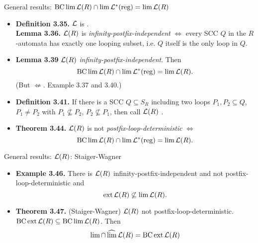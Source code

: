 \documentclass[
	handout,
	notheorems,noamsthm]{beamer}
\begin{document}
\begin{frame}[<+->]{General results: $\operatorname{BC} \lim \mathcal{L}(R) \cap \lim \mathcal{L}^*(\textup{\textrm{reg}}) = \lim \mathcal{L}(R)$}
\begin{itemize}
\item
\textbf{Definition 3.35.} $\mathcal{L}$ is . \\
\textbf{Lemma 3.36.} $\mathcal{L}(R)$ is \emph{infinity-postfix-independent} $\Leftrightarrow$ every SCC $Q$ in the $R$-automata has exactly one looping subset, i.e. $Q$ itself is the only loop in $Q$.
\item \textbf{Lemma 3.39} $\mathcal{L}(R)$ \emph{infinity-postfix-independent}. Then
\[ \operatorname{BC} \lim \mathcal{L}(R) \cap \lim \mathcal{L}^*(\textup{\textrm{reg}}) = \lim \mathcal{L}(R) . \]
(But $\not\Leftarrow$. Example 3.37 and 3.40.)
\item \textbf{Definition 3.41.} If there is a SCC $Q \subseteq S_R$ including two loops $P_1,P_2 \subseteq Q$, $P_1 \neq P_2$ with $P_1 \not\subseteq P_2$, $P_2 \not\subseteq P_1$, then call $\mathcal{L}(R)$ .
\item \textbf{Theorem 3.44.} $\mathcal{L}(R)$ is not \emph{postfix-loop-deterministic} $\Leftrightarrow$
\[ \operatorname{BC} \lim \mathcal{L}(R) \cap \lim \mathcal{L}^*(\textup{\textrm{reg}}) = \lim \mathcal{L}(R) . \]
\end{itemize}
\end{frame}

\begin{frame}[<+->]{General results: $\mathcal{L}(R)$: Staiger-Wagner}
\begin{itemize}
\item \textbf{Example 3.46.} There is $\mathcal{L}(R)$ infinity-postfix-independent and not postfix-loop-deterministic and
\[ \operatorname{ext} \mathcal{L}(R) \not\subseteq \lim \mathcal{L}(R) . \]
\item \textbf{Theorem 3.47.} (Staiger-Wagner) $\mathcal{L}(R)$ not postfix-loop-deterministic. $\operatorname{BC} \operatorname{ext} \mathcal{L}(R) \subseteq \operatorname{BC} \lim \mathcal{L}(R)$. Then
\[ \lim \cap \operatorname{\widehat{lim}} \mathcal{L}(R) = \operatorname{BC} \operatorname{ext} \mathcal{L}(R) \]
\end{itemize}
\end{frame}
\end{document}
